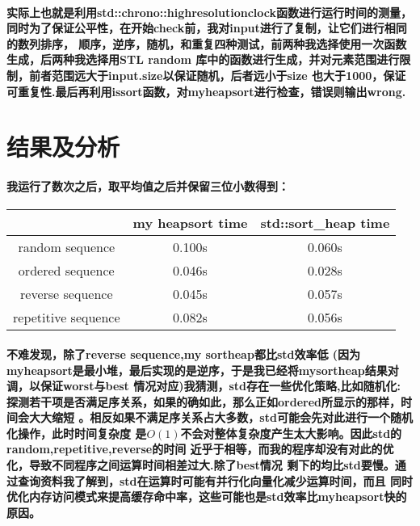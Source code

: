 \documentclass[UTF8]{ctexart}
\begin{document}
\paragraph{\hspace{2em}实际上也就是利用std::chrono::highresolutionclock函数进行运行时间的测量，
同时为了保证公平性，在开始check前，我对input进行了复制，让它们进行相同的数列排序，
顺序，逆序，随机，和重复四种测试，前两种我选择使用一次函数生成，后两种我选择用STL random
库中的函数进行生成，并对元素范围进行限制，前者范围远大于input.size以保证随机，后者远小于size
也大于1000，保证可重复性.最后再利用issort函数，对myheapsort进行检查，错误则输出wrong.
}
\section{结果及分析}
\paragraph{\hspace{2em}我运行了数次之后，取平均值之后并保留三位小数得到：\newline
}

\par

\begin{tabular}{|c|c|c|} 
    \hline  %
     & my heapsort time & std::sort\_heap time \\  %
    \hline  %
    random sequence & 0.100s & 0.060s \\  %
    \hline
    ordered sequence & 0.046s & 0.028s \\  %
    \hline  %
    reverse sequence & 0.045s & 0.057s \\
    \hline
    repetitive sequence & 0.082s & 0.056s \\
    \hline
\end{tabular}


\par

\paragraph{\hspace{2em}不难发现，除了reverse sequence,my sortheap都比std效率低
(因为myheapsort是最小堆，最后实现的是逆序，于是我已经将mysortheap结果对调，以保证worst与best
情况对应)我猜测，std存在一些优化策略,比如随机化:
探测若干项是否满足序关系，如果的确如此，那么正如ordered所显示的那样，时间会大大缩短
。相反如果不满足序关系占大多数，std可能会先对此进行一个随机化操作，此时时间复杂度
是$O(1)$不会对整体复杂度产生太大影响。因此std的random,repetitive,reverse的时间
近乎于相等，而我的程序却没有对此的优化，导致不同程序之间运算时间相差过大.除了best情况
剩下的均比std要慢。通过查询资料我了解到，std在运算时可能有并行化向量化减少运算时间，而且
同时优化内存访问模式来提高缓存命中率，这些可能也是std效率比myheapsort快的原因。}
\end{document}
